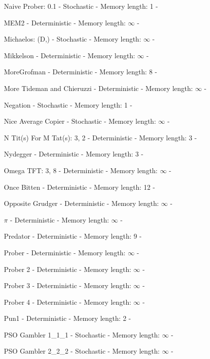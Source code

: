 \item Naive Prober: 0.1 - Stochastic - Memory length: 1 - \cite{Li2011}
\item MEM2 - Deterministic - Memory length: \(\infty\) - \cite{Li2014}
\item Michaelos: (D,) - Stochastic - Memory length: \(\infty\) - \cite{LessWrong2011}
\item Mikkelson - Deterministic - Memory length: \(\infty\) - \cite{Axelrod1980b}
\item MoreGrofman - Deterministic - Memory length: 8 - \cite{Axelrod1980b}
\item More Tideman and Chieruzzi - Deterministic - Memory length: \(\infty\) - \cite{Axelrod1980b}
\item Negation - Stochastic - Memory length: 1 - \cite{PD2017}
\item Nice Average Copier - Stochastic - Memory length: \(\infty\) - \cite{Knight2018}
\item N Tit(s) For M Tat(s): 3, 2 - Deterministic - Memory length: 3 - \cite{Knight2018}
\item Nydegger - Deterministic - Memory length: 3 - \cite{Axelrod1980}
\item Omega TFT: 3, 8 - Deterministic - Memory length: \(\infty\) - \cite{Slany2007}
\item Once Bitten - Deterministic - Memory length: 12 - \cite{Knight2018}
\item Opposite Grudger - Deterministic - Memory length: \(\infty\) - \cite{Knight2018}
\item $\pi$ - Deterministic - Memory length: \(\infty\) - \cite{Knight2018}
\item Predator - Deterministic - Memory length: 9 - \cite{Ashlock2006b}
\item Prober - Deterministic - Memory length: \(\infty\) - \cite{Li2011}
\item Prober 2 - Deterministic - Memory length: \(\infty\) - \cite{Prison1998}
\item Prober 3 - Deterministic - Memory length: \(\infty\) - \cite{Prison1998}
\item Prober 4 - Deterministic - Memory length: \(\infty\) - \cite{Prison1998}
\item Pun1 - Deterministic - Memory length: 2 - \cite{Ashlock2006}
\item PSO Gambler 1\_1\_1 - Stochastic - Memory length: \(\infty\) - \cite{Knight2018}
\item PSO Gambler 2\_2\_2 - Stochastic - Memory length: \(\infty\) - \cite{Knight2018}
